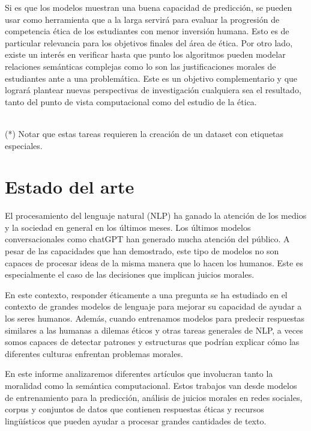 \documentclass[
	spanish, %
	letterpaper, oneside
]{article}
\begin{document}
Si es que los modelos muestran una buena capacidad de predicción, se pueden usar como herramienta que a la larga servirá para evaluar la progresión de competencia ética de los estudiantes con menor inversión humana. Esto es de particular relevancia para los objetivos finales del área de ética. Por otro lado, existe un interés en verificar hasta que punto los algoritmos pueden modelar relaciones semánticas complejas como lo son las justificaciones morales de estudiantes ante a una problemática. Este es un objetivo complementario y que logrará plantear nuevas perspectivas de investigación cualquiera sea el resultado, tanto del punto de vista computacional como del estudio de la ética.

\\ (*) Notar que estas tareas requieren la creación de un dataset con etiquetas especiales.


\section{Estado del arte}

El procesamiento del lenguaje natural (NLP) ha ganado la atención de los medios y la sociedad en general en los últimos meses. Los últimos modelos conversacionales como chatGPT han generado mucha atención del público. A pesar de las capacidades que han demostrado, este tipo de modelos no son capaces de procesar ideas de la misma manera que lo hacen los humanos. Este es especialmente el caso de las decisiones que implican juicios morales.

\newp En este contexto, responder éticamente a una pregunta se ha estudiado en el contexto de grandes modelos de lenguaje para mejorar su capacidad de ayudar a los seres humanos. Además, cuando entrenamos modelos para predecir respuestas similares a las humanas a dilemas éticos y otras tareas generales de NLP, a veces somos capaces de detectar patrones y estructuras que podrían explicar cómo las diferentes culturas enfrentan problemas morales.

\newp En este informe analizaremos diferentes artículos que involucran tanto la moralidad como la semántica computacional. Estos trabajos van desde modelos de entrenamiento para la predicción, análisis de juicios morales en redes sociales, corpus y conjuntos de datos que contienen respuestas éticas y recursos lingüísticos que pueden ayudar a procesar grandes cantidades de texto.
\end{document}
